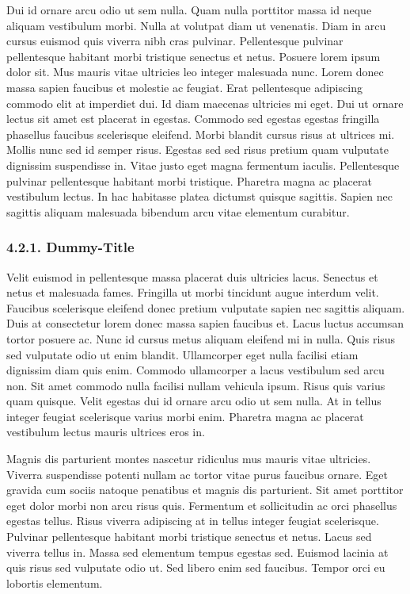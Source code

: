 \documentclass[
]{article}
\begin{document}
Dui id ornare arcu odio ut sem nulla. Quam nulla porttitor massa id
neque aliquam vestibulum morbi. Nulla at volutpat diam ut venenatis.
Diam in arcu cursus euismod quis viverra nibh cras pulvinar.
Pellentesque pulvinar pellentesque habitant morbi tristique senectus et
netus. Posuere lorem ipsum dolor sit. Mus mauris vitae ultricies leo
integer malesuada nunc. Lorem donec massa sapien faucibus et molestie ac
feugiat. Erat pellentesque adipiscing commodo elit at imperdiet dui. Id
diam maecenas ultricies mi eget. Dui ut ornare lectus sit amet est
placerat in egestas. Commodo sed egestas egestas fringilla phasellus
faucibus scelerisque eleifend. Morbi blandit cursus risus at ultrices
mi. Mollis nunc sed id semper risus. Egestas sed sed risus pretium quam
vulputate dignissim suspendisse in. Vitae justo eget magna fermentum
iaculis. Pellentesque pulvinar pellentesque habitant morbi tristique.
Pharetra magna ac placerat vestibulum lectus. In hac habitasse platea
dictumst quisque sagittis. Sapien nec sagittis aliquam malesuada
bibendum arcu vitae elementum curabitur.

\hypertarget{dummy-title-5}{%
\subsubsection{4.2.1. Dummy-Title}\label{dummy-title-5}}

Velit euismod in pellentesque massa placerat duis ultricies lacus.
Senectus et netus et malesuada fames. Fringilla ut morbi tincidunt augue
interdum velit. Faucibus scelerisque eleifend donec pretium vulputate
sapien nec sagittis aliquam. Duis at consectetur lorem donec massa
sapien faucibus et. Lacus luctus accumsan tortor posuere ac. Nunc id
cursus metus aliquam eleifend mi in nulla. Quis risus sed vulputate odio
ut enim blandit. Ullamcorper eget nulla facilisi etiam dignissim diam
quis enim. Commodo ullamcorper a lacus vestibulum sed arcu non. Sit amet
commodo nulla facilisi nullam vehicula ipsum. Risus quis varius quam
quisque. Velit egestas dui id ornare arcu odio ut sem nulla. At in
tellus integer feugiat scelerisque varius morbi enim. Pharetra magna ac
placerat vestibulum lectus mauris ultrices eros in.

Magnis dis parturient montes nascetur ridiculus mus mauris vitae
ultricies. Viverra suspendisse potenti nullam ac tortor vitae purus
faucibus ornare. Eget gravida cum sociis natoque penatibus et magnis dis
parturient. Sit amet porttitor eget dolor morbi non arcu risus quis.
Fermentum et sollicitudin ac orci phasellus egestas tellus. Risus
viverra adipiscing at in tellus integer feugiat scelerisque. Pulvinar
pellentesque habitant morbi tristique senectus et netus. Lacus sed
viverra tellus in. Massa sed elementum tempus egestas sed. Euismod
lacinia at quis risus sed vulputate odio ut. Sed libero enim sed
faucibus. Tempor orci eu lobortis elementum.
\end{document}
